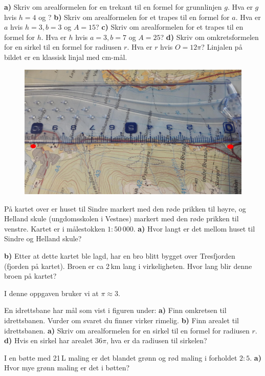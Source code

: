 \textbf{a)} Skriv om arealformelen for en trekant til en formel for grunnlinjen $ g $. Hva er $ g $ hvis $ {h=4} $ og ?\os
\textbf{b)} Skriv om arealformelen for et trapes til en formel for $ a $. Hva er $ a $ hvis $ {h=3, b=3} $ og $ A= 15$?\os
\textbf{c)} Skriv om arealformelen for et trapes til en formel for $ h $. Hva er $ h $ hvis $ {a=3, b=7} $ og $ {A=25} $?\os
\textbf{d)} Skriv om omkretsformelen for en sirkel til en formel for radiusen $ r $. Hva er $ r $ hvis $ {O=12\pi} $?
\newpage
{}
Linjalen på bildet er en klassisk linjal med cm-mål.
\begin{figure}
	\centering
	\includegraphics[scale=0.08]{kart}
\end{figure}
På kartet over er huset til Sindre markert med den røde prikken til høyre, og Helland skule (ungdomsskolen i Vestnes) markert med den røde prikken til venstre. Kartet er i målestokken $ {1:50\,000} $.\os
\textbf{a)} Hvor langt er det mellom huset til Sindre og Helland skule?\os

\textbf{b)} Etter at dette kartet ble lagd, har en bro blitt bygget over Tresfjorden (fjorden på kartet). Broen er ca 2\,km lang i virkeligheten. Hvor lang blir denne broen på kartet?

I denne oppgaven bruker vi at $ \pi\approx 3 $.\os

En idrettsbane har mål som vist i figuren under:
\textbf{a)} Finn omkretsen til idrettsbanen. Vurder om svaret du finner virker rimelig.\os
\textbf{b)} Finn arealet til idrettsbanen.
\newpage
{}
\textbf{a)} Skriv om arealformelen for en sirkel til en formel for radiusen $ r $.\os
\textbf{d)} Hvis en sirkel har arealet $ 36\pi $, hva er da radiusen til sirkelen?

I en bøtte med 21\,L maling er det blandet grønn og rød maling i forholdet $ {2:5} $.\os
\textbf{a)} Hvor mye grønn maling er det i bøtten?\os

